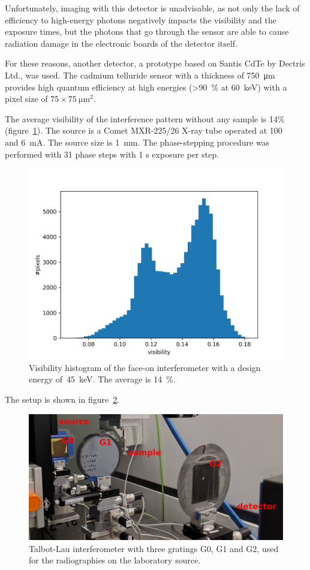 Unfortunately, imaging with this detector is unadvisable, as not only the lack of efficiency to
high-energy photons negatively impacts the visibility and the exposure
times, but the photons that go through the sensor are able to cause
radiation damage in the electronic boards of the detector itself.

For these reasons, another detector, a prototype based on Santis CdTe by
Dectris Ltd., was used. The cadmium
telluride sensor with a thickness of \SI{750}{\micro\meter} provides high
quantum efficiency at high energies (>\SI{90}{\percent} at
\SI{60}{\kilo\eV}) with a pixel size of
$75\times\SI{75}{\micro\meter\squared}$. 

The average visibility of the interference pattern without any
sample is 14\% (figure~\ref{fig:visibility-titlis}). The source is a Comet
MXR-225/26 X-ray tube operated at \SI{100}{\kilo\voltpeak} and
\SI{6}{\milli\ampere}. The source size is \SI{1}{\milli\meter}.
The phase-stepping procedure was performed with 31 phase steps with 1 s
exposure per step.

\begin{figure}[htb]
    \centering
    \includegraphics[width=.8\textwidth]{gfx/visibility_titlis.png}
    \caption{Visibility histogram of the face-on interferometer with a
        design energy of~\SI{45}{\kilo\eV}. The average is
        \SI{14}{\percent}.}
    \label{fig:visibility-titlis}
\end{figure}

The setup is shown in figure~\ref{248327}.

\begin{figure}[htb]
    \centering
    \includegraphics[width=0.70\columnwidth]{gfx/lung-paper-figures/lung-setup/lung-setup}
    \caption{{Talbot-Lau interferometer with three gratings G0, G1 and G2, used for
        the radiographies on the laboratory source.
        {\label{248327}}%
    }}
\end{figure}

